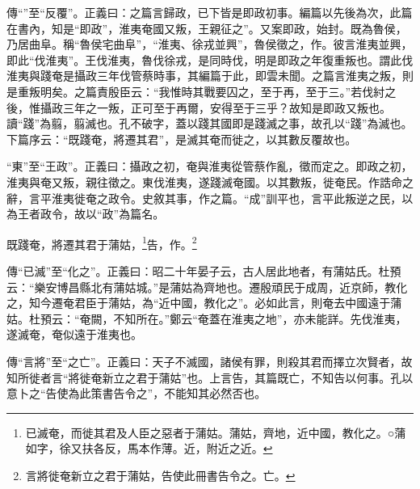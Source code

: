 {\noindent\zhuan{}\fzbyks 傳“”至“反覆”。正義曰：之篇言歸政，已下皆是即政初事。編篇以先後為次，此篇在書內，知是“即政”，淮夷奄國又叛，王親征之”。又案即政，始封。既為魯侯，乃居曲阜。稱“魯侯宅曲阜”，“淮夷、徐戎並興”，魯侯徵之，作。彼言淮夷並興，即此“伐淮夷”。王伐淮夷，魯伐徐戎，是同時伐，明是即政之年復重叛也。謂此伐淮夷與踐奄是攝政三年伐管蔡時事，其編篇于此，即雲未聞。之篇言淮夷之叛，則是重叛明矣。之篇責殷臣云：“我惟時其戰要囚之，至于再，至于三。”若伐紂之後，惟攝政三年之一叛，正可至于再爾，安得至于三乎？故知是即政又叛也。讀“踐”為翦，翦滅也。孔不破字，蓋以踐其國即是踐滅之事，故孔以“踐”為滅也。下篇序云：“既踐奄，將遷其君”，是滅其奄而徙之，以其數反覆故也。 \par}

{\noindent\shu{}\fzkt “東”至“王政”。正義曰：攝政之初，奄與淮夷從管蔡作亂，徵而定之。即政之初，淮夷與奄又叛，親往徵之。東伐淮夷，遂踐滅奄國。以其數叛，徙奄民。作誥命之辭，言平淮夷徙奄之政令。史敘其事，作之篇。“成”訓平也，言平此叛逆之民，以為王者政令，故以“政”為篇名。 \par}

既踐奄，將遷其君于蒲姑，\footnote{已滅奄，而徙其君及人臣之惡者于蒲姑。蒲姑，齊地，近中國，教化之。○蒲如字，徐又扶各反，馬本作薄。近，附近之近。}告，作。\footnote{言將徙奄新立之君于蒲姑，告使此冊書告令之。亡。}


{\noindent\zhuan{}\fzbyks 傳“已滅”至“化之”。正義曰：昭二十年晏子云，古人居此地者，有蒲姑氏。杜預云：“樂安博昌縣北有蒲姑城。”是蒲姑為齊地也。遷殷頑民于成周，近京師，教化之，知今遷奄君臣于蒲姑，為“近中國，教化之”。必如此言，則奄去中國遠于蒲姑。杜預云：“奄闕，不知所在。”鄭云“奄蓋在淮夷之地”，亦未能詳。先伐淮夷，遂滅奄，奄似遠于淮夷也。 \par}

{\noindent\zhuan{}\fzbyks 傳“言將”至“之亡”。正義曰：天子不滅國，諸侯有罪，則殺其君而擇立次賢者，故知所徙者言“將徙奄新立之君于蒲姑”也。上言告，其篇既亡，不知告以何事。孔以意卜之“告使為此策書告令之”，不能知其必然否也。 \par}


